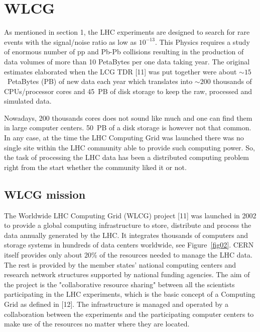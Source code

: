 \documentclass{intech}
\begin{document}

\section{WLCG}

As mentioned in section 1, the LHC experiments are designed to
search for rare events with the signal/noise ratio as low
as $10^{-13}$. This Physics requires a study of enormous number of
pp and Pb-Pb collisions resulting in the production of data volumes
of more than 10 PetaBytes per one data taking year. The original
estimates elaborated when the LCG TDR [11] was put together were
about $\sim 15$~PetaBytes (PB) of new data each year which
translates into $\sim 200$ thousands of CPUs/processor cores and
45~PB of disk storage to keep the raw, processed and simulated data.

Nowadays, 200 thousands cores does not sound like much and one can
find them in large computer centers. 50~PB of a disk storage is
however not that common. In any case, at the time the LHC Computing
Grid was launched there was no single site within the LHC community
able to provide such computing power. So, the task of
processing the LHC data has been a distributed computing problem
right from the start whether the community liked it or not.

\subsection{WLCG mission}
%
The Worldwide LHC Computing Grid (WLCG) project [11] was launched in
2002 to provide a global computing infrastructure to store,
distribute and process the data annually generated by the LHC.
It integrates thousands of computers and storage systems
in hundreds of data centers worldwide, see Figure~\ref{fig02}. CERN
itself provides only about 20\% of the resources needed to manage
the LHC data. The rest is provided by the member states' national
computing centers and research network structures supported by
national funding agencies. The aim of the project is the
"collaborative resource sharing" between all the scientists
participating in the LHC experiments, which is the basic concept of
a Computing Grid as defined in [12]. The infrastructure is managed
and operated by a collaboration between the experiments and the
participating computer centers to make use of the resources no
matter where they are located.
\end{document}
